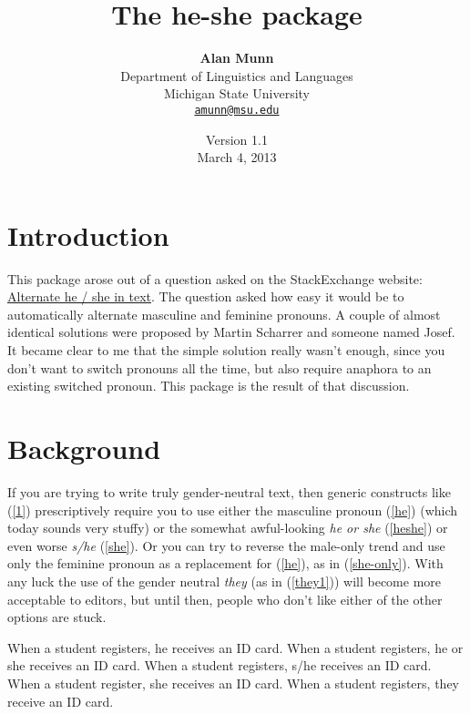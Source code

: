 \documentclass[11pt]{article}
\title{\textbf{The \textsf{he-she} package}}
\author{\textbf{Alan Munn}\\Department of Linguistics and Languages\\Michigan State University\\\texttt{\href{mailto:amunn@msu.edu}{amunn@msu.edu}}}
\date{Version 1.1\\March 4, 2013}
\begin{document}
\maketitle
\thispagestyle{empty}
\renewcommand{\abstractname}{\sffamily Abstract}

\section{Introduction}
This package arose out of a question asked on the StackExchange website: \href{http://tex.stackexchange.com/questions/10787/}{Alternate he / she in text}. The question asked how easy it would be to automatically alternate masculine and feminine pronouns. A couple of almost identical solutions were proposed by Martin Scharrer and someone named Josef.  It became clear to me that the simple solution really wasn't enough, since you don't want to switch pronouns all the time, but also require anaphora to an existing switched pronoun.  This package is the result of that discussion. 
\section{Background}
If you are trying to write truly gender-neutral text, then generic constructs like (\ref{1}) prescriptively require you to use either the masculine pronoun (\ref{he}) (which today sounds very stuffy) or the somewhat awful-looking \emph{he or she} (\ref{heshe}) or even worse \emph{s/he} (\ref{she}). Or you can try to reverse the male-only trend and use only the feminine pronoun as a replacement for (\ref{he}), as in (\ref{she-only}). With any luck the use of the gender neutral \emph{they} (as in (\ref{they1})) will become more acceptable to editors, but until then, people who don't like either of the other options are stuck.

\begin{exe}
\ex\label{1}
\begin{xlist}
\ex When a student registers, he receives an ID card.\label{he}
\ex When a student registers, he or she receives an ID card.\label{heshe}
\ex When a student registers, s/he receives an ID card.\label{she}
\ex When a student register, she receives an ID card.\label{she-only}
\ex When a student registers, they receive an ID card.\label{they1}
\end{xlist}
\end{exe}
\end{document}

